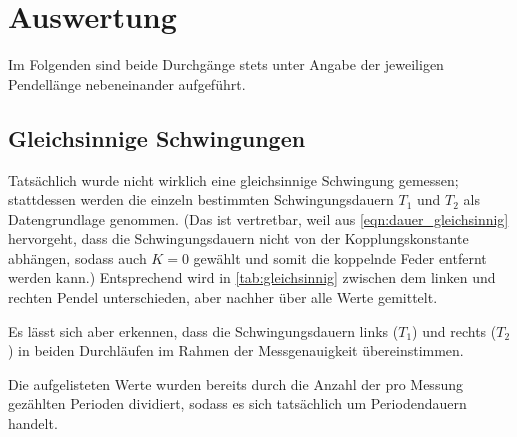 \section{Auswertung}
\label{sec:auswertung}

Im Folgenden sind beide Durchgänge stets
unter Angabe der jeweiligen Pendellänge
nebeneinander aufgeführt.

\subsection{Gleichsinnige Schwingungen}
\label{sec:auswertung:gleichsinnig}

Tatsächlich wurde nicht wirklich eine gleichsinnige Schwingung gemessen;
stattdessen werden die einzeln bestimmten Schwingungsdauern $T_1$ und $T_2$ als Datengrundlage genommen.
(Das ist vertretbar, weil aus \autoref{eqn:dauer_gleichsinnig} hervorgeht,
dass die Schwingungsdauern nicht von der Kopplungskonstante abhängen,
sodass auch $K=0$ gewählt und somit die koppelnde Feder entfernt werden kann.)
Entsprechend wird in \autoref{tab:gleichsinnig} zwischen dem linken und rechten Pendel unterschieden,
aber nachher über alle Werte gemittelt.

Es lässt sich aber erkennen,
dass die Schwingungsdauern links ($T_1$) und rechts ($T_2$) in beiden Durchläufen
im Rahmen der Messgenauigkeit übereinstimmen.

Die aufgelisteten Werte wurden bereits durch die Anzahl der pro Messung gezählten Perioden dividiert,
sodass es sich tatsächlich um Periodendauern handelt.

